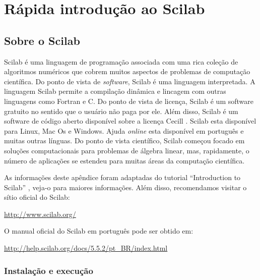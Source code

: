 
%

\chapter{Rápida introdução ao Scilab}\label{cap:scilab}

\section{Sobre o Scilab}

Scilab é uma linguagem de programação associada com uma rica coleção de algoritmos numéricos que cobrem muitos aspectos de problemas de computação científica. Do ponto de vista de {\it software}, Scilab é uma linguagem interpretada. A linguagem Scilab permite a compilação dinâmica e lincagem com outras linguagens como Fortran e C. Do ponto de vista de licença, Scilab é um software gratuito no sentido que o usuário não paga por ele. Além disso, Scilab é um software de código aberto disponível sobre a licença Cecill \cite{Cecill}. Scilab esta disponível para Linux, Mac Os e Windows. Ajuda {\it online} esta disponível em português e muitas outras línguas. Do ponto de vista científico, Scilab começou focado em soluções computacionais para problemas de álgebra linear, mas, rapidamente, o número de aplicações se estendeu para muitas áreas da computação científica.

As informações deste apêndice foram adaptadas do tutorial ``Introduction to Scilab'' \cite{Scilab15}, veja-o para maiores informações. Além disso, recomendamos visitar o sítio oficial do Scilab:
\begin{center}
  \url{http://www.scilab.org/}
\end{center}

O manual oficial do Scilab em português pode ser obtido em:
\begin{center}
  \url{http://help.scilab.org/docs/5.5.2/pt_BR/index.html}
\end{center}

\subsection{Instalação e execução}

